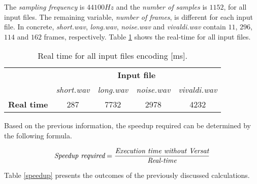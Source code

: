 The \textit{sampling frequency} is $44100Hz$ and the \textit{number of samples} is $1152$, for all input files. The remaining variable, \textit{number of frames}, is different for each input file. In concrete, \textit{short.wav}, \textit{long.wav}, \textit{noise.wav} and \textit{vivaldi.wav} contain $11$, $296$, $114$ and $162$ frames, respectively.
Table \ref{realtime} shows the real-time for all input files.

\vspace{0.5cm}

\begin{table}[H]
    \centering
    \begin{tabular}{|c|c|c|c|c|}
    \cline{2-5}
    \multicolumn{1}{c|}{}  & \multicolumn{4}{c|}{\textbf{Input file}} \\
    \cline{2-5}
    \multicolumn{1}{c|}{} & \textit{short.wav} & \textit{long.wav} & \textit{noise.wav} & \textit{vivaldi.wav} \\
    \hline
    \textbf{Real time} & 287 & 7732 & 2978 & 4232  \\ 
    \hline
    \end{tabular}
    \caption{Real time for all input files encoding [ms].}
    \label{realtime}
\end{table}

\vspace{0.3cm}

Based on the previous information, the speedup required can be determined by the following formula.

\begin{equation}
    \textit{Speedup required} = \frac{\textit{Execution time without \textit{Versat}}}{\textit{Real-time}} 
\end{equation}

Table \ref{speedup} presents the outcomes of the previously discussed calculations.

\vspace{0.5cm}

